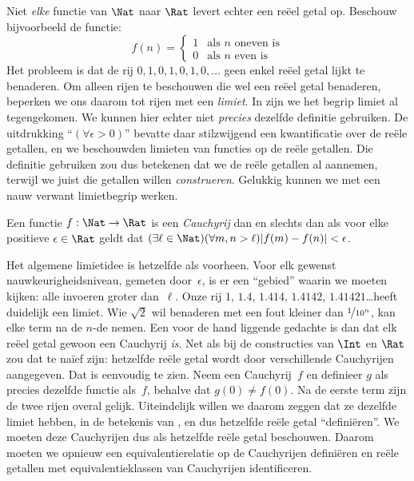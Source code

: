 \documentclass[../../../include/open-logic-section]{subfiles}
\begin{document}
Niet \emph{elke} functie van $\Nat$ naar $\Rat$ levert echter een reëel
getal op. Beschouw bijvoorbeeld de functie:
\[
	f(n) =\begin{cases}
			1 & \text{als }n\text{ oneven is}\\
			0 &\text{als }n\text{ even is}
		\end{cases}
\]
Het probleem is dat de rij $0,1,0,1,0,1,0,\ldots$ geen enkel reëel
getal lijkt te benaderen. Om alleen rijen te beschouwen die wel een
reëel getal benaderen, beperken we ons daarom tot rijen met een
\emph{limiet}.
In  zijn we het begrip limiet al
tegengekomen. We kunnen hier echter niet \emph{precies} dezelfde
definitie gebruiken. De uitdrukking ``$(\forall \epsilon>0)$'' bevatte
daar stilzwijgend een kwantificatie over de reële getallen, en we
beschouwden limieten van functies op de reële getallen. Die definitie
gebruiken zou dus betekenen dat we de reële getallen al aannemen,
terwijl we juist die getallen willen \emph{construeren}. Gelukkig
kunnen we met een nauw verwant limietbegrip werken.
\begin{defn}
  Een functie $f: \Nat \to \Rat$ is een \emph{Cauchyrij} dan en slechts
  dan als voor elke positieve $\epsilon \in \Rat$ geldt dat $(\exists
  \ell \in \Nat)(\forall m, n > \ell)|f(m) - f(n)| < \epsilon$.
\end{defn}
Het algemene limietidee is hetzelfde als voorheen. Voor elk gewenst
nauwkeurigheidsniveau, gemeten door~$\epsilon$, is er een ``gebied''
waarin we moeten kijken: alle invoeren groter dan~$\ell$. Onze rij
$1$, $1.4$, $1.414$, $1.4142$, $1.41421$\ldots heeft duidelijk een
limiet. Wie $\sqrt{2}$ wil benaderen met een fout kleiner dan
$\nicefrac{1}{10^{n}}$, kan elke term na de $n$-de nemen.
Een voor de hand liggende gedachte is dan dat elk reëel getal gewoon
een Cauchyrij \emph{is}. Net als bij de constructies van $\Int$ en
$\Rat$ zou dat te na\"ief zijn: hetzelfde reële getal wordt door
verschillende Cauchyrijen aangegeven. Dat is eenvoudig te zien. Neem
een Cauchyrij~$f$ en definieer $g$ als precies dezelfde functie als~$f$,
behalve dat $g(0)\neq f(0)$. Na de eerste term zijn de twee rijen
overal gelijk. Uiteindelijk willen we daarom zeggen dat ze dezelfde
limiet hebben, in de betekenis van , en dus
hetzelfde reële getal ``definiëren''. We moeten deze Cauchyrijen dus als
hetzelfde reële getal beschouwen.
Daarom moeten we opnieuw een equivalentierelatie op de Cauchyrijen
definiëren en reële getallen met equivalentieklassen van Cauchyrijen identificeren.
\end{document}
